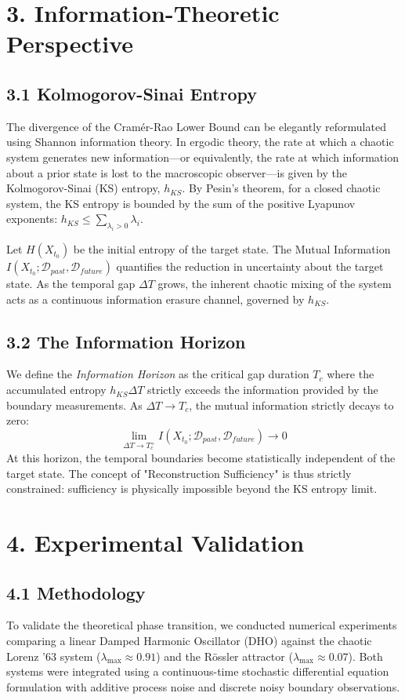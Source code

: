 \documentclass[aps,prl,reprint,superscriptaddress,nofootinbib]{revtex4-2}
\begin{document}
\section{3. Information-Theoretic Perspective}

\subsection{3.1 Kolmogorov-Sinai Entropy}
The divergence of the Cram\'{e}r-Rao Lower Bound can be elegantly reformulated using Shannon information theory. In ergodic theory, the rate at which a chaotic system generates new information---or equivalently, the rate at which information about a prior state is lost to the macroscopic observer---is given by the Kolmogorov-Sinai (KS) entropy, $h_{KS}$. By Pesin's theorem, for a closed chaotic system, the KS entropy is bounded by the sum of the positive Lyapunov exponents: $h_{KS} \le \sum_{\lambda_i > 0} \lambda_i$.

Let $H(X_{t_0})$ be the initial entropy of the target state. The Mutual Information $I(X_{t_0} ; \mathcal{D}_{past}, \mathcal{D}_{future})$ quantifies the reduction in uncertainty about the target state. As the temporal gap $\Delta T$ grows, the inherent chaotic mixing of the system acts as a continuous information erasure channel, governed by $h_{KS}$.

\subsection{3.2 The Information Horizon}
We define the \textit{Information Horizon} as the critical gap duration $T_c$ where the accumulated entropy $h_{KS} \Delta T$ strictly exceeds the information provided by the boundary measurements. As $\Delta T \to T_c$, the mutual information strictly decays to zero:
\begin{equation}
\lim_{\Delta T \to T_c^+} I(X_{t_0} ; \mathcal{D}_{past}, \mathcal{D}_{future}) \to 0
\end{equation}
At this horizon, the temporal boundaries become statistically independent of the target state. The concept of "Reconstruction Sufficiency" is thus strictly constrained: sufficiency is physically impossible beyond the KS entropy limit. 

\section{4. Experimental Validation}

\subsection{4.1 Methodology}
To validate the theoretical phase transition, we conducted numerical experiments comparing a linear Damped Harmonic Oscillator (DHO) against the chaotic Lorenz '63 system ($\lambda_{\max} \approx 0.91$) and the R\"{o}ssler attractor ($\lambda_{\max} \approx 0.07$). Both systems were integrated using a continuous-time stochastic differential equation formulation with additive process noise and discrete noisy boundary observations.
\end{document}
